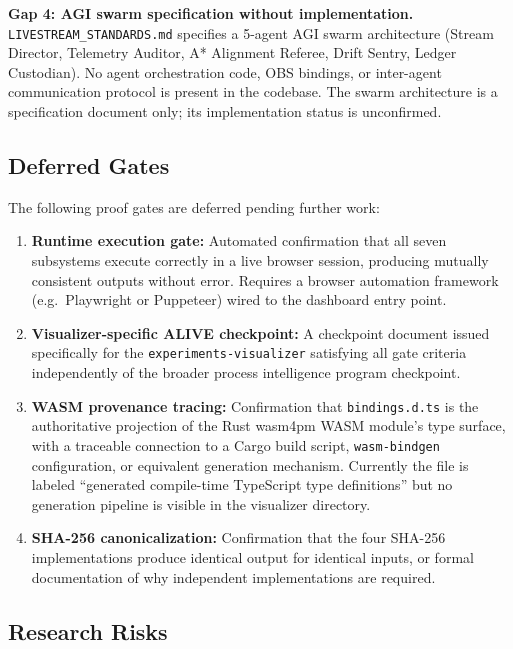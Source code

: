 \textbf{Gap 4: AGI swarm specification without implementation.}
\texttt{LIVESTREAM\_STANDARDS.md} specifies a 5-agent AGI swarm architecture (Stream Director,
Telemetry Auditor, A* Alignment Referee, Drift Sentry, Ledger Custodian). No agent
orchestration code, OBS bindings, or inter-agent communication protocol is present in the
codebase. The swarm architecture is a specification document only; its implementation status
is unconfirmed.

\subsection{Deferred Gates}
\label{sec:experiments-visualizer-openq-deferred}

The following proof gates are deferred pending further work:

\begin{enumerate}
  \item \textbf{Runtime execution gate:} Automated confirmation that all seven subsystems
        execute correctly in a live browser session, producing mutually consistent outputs
        without error. Requires a browser automation framework (e.g.\ Playwright or Puppeteer)
        wired to the dashboard entry point.
  \item \textbf{Visualizer-specific ALIVE checkpoint:} A checkpoint document issued specifically
        for the \texttt{experiments-visualizer} satisfying all gate criteria independently of
        the broader process intelligence program checkpoint.
  \item \textbf{WASM provenance tracing:} Confirmation that \texttt{bindings.d.ts} is the
        authoritative projection of the Rust wasm4pm WASM module's type surface, with a
        traceable connection to a Cargo build script, \texttt{wasm-bindgen} configuration, or
        equivalent generation mechanism. Currently the file is labeled ``generated compile-time
        TypeScript type definitions'' but no generation pipeline is visible in the visualizer
        directory.
  \item \textbf{SHA-256 canonicalization:} Confirmation that the four SHA-256 implementations
        produce identical output for identical inputs, or formal documentation of why
        independent implementations are required.
\end{enumerate}

\subsection{Research Risks}
\label{sec:experiments-visualizer-openq-risks}

